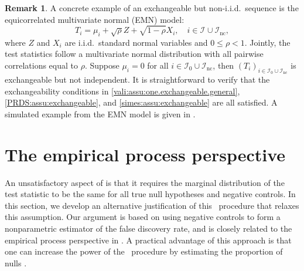 \documentclass[a4paper,11pt]{article}
\theoremstyle{plain}
\theoremstyle{definition}
\newtheorem{remark}{Remark}
\def\calI{\mathcal{I}}
\theoremstyle{plain}
\newcommand{\testStatistics}[1]{{T_{#1}}}
\newcommand{\nickname}{{\text{RANC}}}
\newcommand{\hypothesisIndex}[1]{{\calI_{#1}}}
\newcommand{\nullHypothesisIndex}{{\calI_{0}}}
\newcommand{\FDR}{\text{FDR}}
\newcommand{\PRDS}{{\text{PRDS}}}
\newcommand{\BH}{{\text{BH}}}
\begin{document}

\begin{remark} \label{rem:emn}
  A concrete example of an exchangeable but non-i.i.d.\ sequence is the
  equicorrelated multivariate normal (EMN) model:
  \begin{equation}
    \label{eq:emn}
      \testStatistics{i} = \mu_i
+ \sqrt{\rho}Z + \sqrt{1-\rho}X_i,\quad {i \in \hypothesisIndex{} \cup
  \hypothesisIndex{\text{nc}}},
\end{equation}
where $Z$ and $X_i$ are
i.i.d.~standard normal variables and $0 \le \rho < 1$.
Jointly, the test statistics follow a multivariate normal distribution
with all pairwise correlations equal to $\rho$. Suppose $\mu_i = 0$
for all $i \in \nullHypothesisIndex \cup \hypothesisIndex{\text{nc}}$, then
$(\testStatistics{i})_{i \in \nullHypothesisIndex \cup
  \hypothesisIndex{\text{nc}}}$ is exchangeable but not
independent. It is straightforward to verify that the exchangeability
conditions in
\ref{vali:assu:one.exchangeable.general},
\ref{PRDS:assu:exchangeable}, and
\ref{simes:assu:exchangeable} are all satisfied.
A simulated example from the EMN model is given in .
\end{remark}


\section{The empirical process
  perspective}\label{sec:empirical.process}

An unsatisfactory aspect of  is that it requires
the marginal distribution of the test statistic to be the same for all
true null hypotheses and negative controls. In this section, we
develop an alternative justification of this \BH~procedure that
relaxes this assumption. Our argument is based on using
negative controls to form a nonparametric estimator of the false
discovery rate, and is closely related to the empirical process
perspective in \textcite{storey2004strong,genovese2004stochastic}. A
practical advantage of this approach is that one can increase the
power of the \BH~procedure by estimating the proportion of nulls
\parencite{storey2002direct}.
\end{document}
